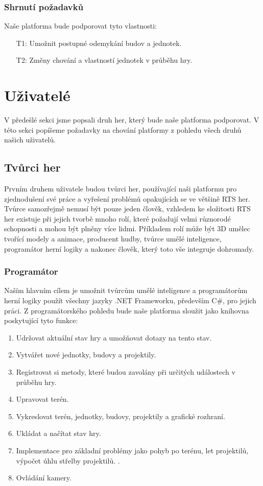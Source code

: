 \subsubsection{Shrnutí požadavků}

Naše platforma bude podporovat tyto vlastnosti:
\begin{itemize}
	\item[T1:] Umožnit postupné odemykání budov a jednotek.
	\item[T2:] Změny chování a vlastností jednotek v průběhu hry.
\end{itemize}

\section{Uživatelé}
V předešlé sekci jsme popsali druh her, který bude naše platforma podporovat. V této sekci popíšeme požadavky na chování platformy z pohledu všech druhů našich uživatelů.

\subsection{Tvůrci her}
Prvním druhem uživatele budou tvůrci her, používající naši platformu pro zjednodušení své práce a vyřešení problémů opakujících se ve většině RTS her. Tvůrce samozřejmě nemusí být pouze jeden člověk, vzhledem ke složitosti RTS her existuje při jejich tvorbě mnoho rolí, které požadují velmi různorodé schopnosti a mohou být plněny více lidmi. Příkladem rolí může být 3D umělec tvořící modely a animace, producent hudby, tvůrce umělé inteligence, programátor herní logiky a nakonec člověk, který toto vše integruje dohromady.

\subsubsection{Programátor}
Naším hlavním cílem je umožnit tvůrcům umělé inteligence a programátorům herní logiky použít všechny jazyky .NET Frameworku, především C\#, pro jejich práci. Z programátorského pohledu bude naše platforma sloužit jako knihovna poskytující tyto funkce:

\begin{enumerate}
	\item Udržovat aktuální stav hry a umožňovat dotazy na tento stav.
	\item Vytvářet nové jednotky, budovy a projektily.
	\item Registrovat si metody, které budou zavolány při určitých událostech v průběhu hry.
	\item Upravovat terén.
	\item Vykreslovat terén, jednotky, budovy, projektily a grafické rozhraní.
	\item Ukládat a načítat stav hry.
	\item Implementace pro základní problémy jako pohyb po terénu, let projektilů, výpočet úhlu střelby projektilů. .
	\item Ovládání kamery.
\end{enumerate}

